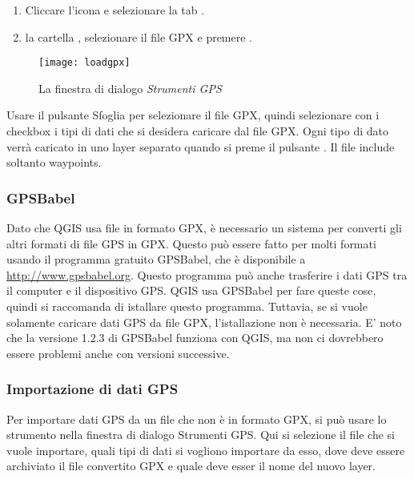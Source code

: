 \begin{enumerate}
\item Cliccare l'icona  e selezionare la tab .
\item {} la cartella ,
selezionare il file GPX  e premere .
\end{enumerate}

\begin{figure}[ht]
   \begin{center}
\caption{\label{gpxloader}La finestra di dialogo \emph{Strumenti GPS}  \nixcaption}
\texttt{[image: loadgpx]}
\end{center}
\end{figure}

Usare il pulsante Sfoglia \browsebutton per selezionare il file GPX, quindi selezionare con i checkbox i tipi di dati che si desidera caricare dal file GPX.
Ogni tipo di dato verrà caricato in uno layer separato quando si preme il pulsante .
Il file  include soltanto waypoints.

\subsubsection{GPSBabel}

Dato che QGIS usa file in formato GPX, è necessario un sistema per converti gli altri formati di file GPS in GPX.
Questo può essere fatto per molti formati usando il programma gratuito GPSBabel, che è disponibile a \url{http://www.gpsbabel.org}.
Questo programma può anche trasferire i dati GPS tra il computer e il dispositivo GPS. QGIS usa GPSBabel per fare queste cose, quindi si raccomanda di istallare questo programma. Tuttavia, se si vuole solamente caricare dati GPS da file GPX, l'istallazione non è necessaria.
E' noto che la versione 1.2.3 di GPSBabel funziona con QGIS, ma non ci dovrebbero essere problemi anche con versioni successive.


\subsubsection{Importazione di dati GPS}

Per importare dati GPS da un file che non è in formato GPX, si può usare lo strumento  nella finestra di dialogo Strumenti GPS.
Qui si selezione il file che si vuole importare, quali tipi di dati si vogliono importare da esso, dove deve essere archiviato il file convertito GPX e quale deve esser il nome del nuovo layer.

